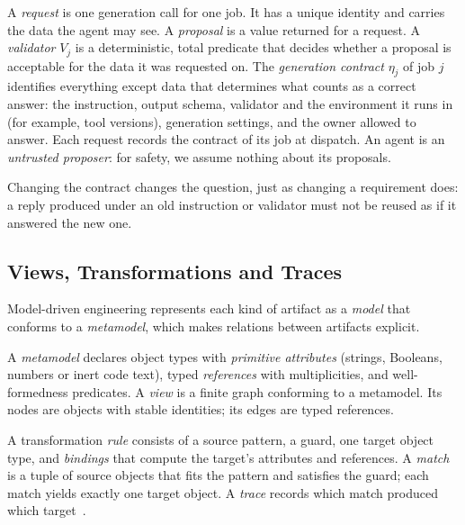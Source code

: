 \begin{definition}\label{def:proposal}
A \emph{request} is one generation call for one job. It has a unique identity and carries the data the agent may see. A \emph{proposal} is a value returned for a request. A \emph{validator} $V_j$ is a deterministic, total predicate that decides whether a proposal is acceptable for the data it was requested on. The \emph{generation contract} $\eta_j$ of job $j$ identifies everything except data that determines what counts as a correct answer: the instruction, output schema, validator and the environment it runs in (for example, tool versions), generation settings, and the owner allowed to answer. Each request records the contract of its job at dispatch. An agent is an \emph{untrusted proposer}: for safety, we assume nothing about its proposals.
\end{definition}

Changing the contract changes the question, just as changing a requirement does: a reply produced under an old instruction or validator must not be reused as if it answered the new one.

\subsection{Views, Transformations and Traces}\label{sec:bg-views}
Model-driven engineering represents each kind of artifact as a \emph{model} that conforms to a \emph{metamodel}, which makes relations between artifacts explicit.

\begin{definition}\label{def:view}
A \emph{metamodel} declares object types with \emph{primitive attributes} (strings, Booleans, numbers or inert code text), typed \emph{references} with multiplicities, and well-formedness predicates. A \emph{view} is a finite graph conforming to a metamodel. Its nodes are objects with stable identities; its edges are typed references.
\end{definition}

\begin{definition}\label{def:rule}
A transformation \emph{rule} consists of a source pattern, a guard, one target object type, and \emph{bindings} that compute the target's attributes and references. A \emph{match} is a tuple of source objects that fits the pattern and satisfies the guard; each match yields exactly one target object. A \emph{trace} records which match produced which target~\cite{atl}.
\end{definition}

